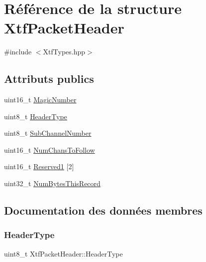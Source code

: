 \hypertarget{structXtfPacketHeader}{}\section{Référence de la structure Xtf\+Packet\+Header}
\label{structXtfPacketHeader}


{\ttfamily \#include $<$Xtf\+Types.\+hpp$>$}

\subsection*{Attributs publics}
\begin{DoxyCompactItemize}
\item 
uint16\+\_\+t \hyperlink{structXtfPacketHeader_a718557ab2cc6dba1ba9763295df98724}{Magic\+Number}
\item 
uint8\+\_\+t \hyperlink{structXtfPacketHeader_a8f14a50bcbebc022e8a38b006e3f1f9f}{Header\+Type}
\item 
uint8\+\_\+t \hyperlink{structXtfPacketHeader_a0c29c4c2486356df904d93e6f2403879}{Sub\+Channel\+Number}
\item 
uint16\+\_\+t \hyperlink{structXtfPacketHeader_a87801fcee3b6ee34115acf36efc41563}{Num\+Chans\+To\+Follow}
\item 
uint16\+\_\+t \hyperlink{structXtfPacketHeader_a74c2e93e14249f898a6dfaf3c4f2a56c}{Reserved1} \mbox{[}2\mbox{]}
\item 
uint32\+\_\+t \hyperlink{structXtfPacketHeader_a070b1178c23543bdbf39de4ae04c7434}{Num\+Bytes\+This\+Record}
\end{DoxyCompactItemize}


\subsection{Documentation des données membres}
\mbox{\label{structXtfPacketHeader_a8f14a50bcbebc022e8a38b006e3f1f9f}} 
\subsubsection{\texorpdfstring{Header\+Type}{HeaderType}}
{\footnotesize\ttfamily uint8\+\_\+t Xtf\+Packet\+Header\+::\+Header\+Type}

\mbox{\label{structXtfPacketHeader_a718557ab2cc6dba1ba9763295df98724}} 
